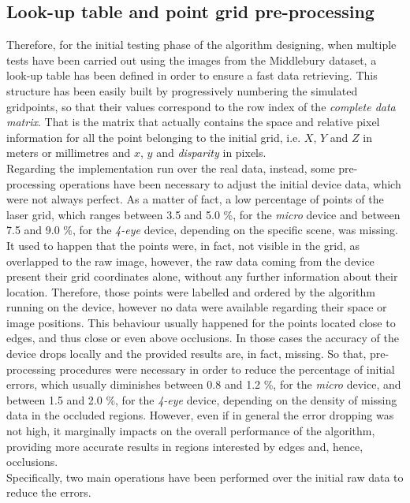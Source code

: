 \subsection{Look-up table and point grid pre-processing}
\label{subsection:grid-preprocessing}

Therefore, for the initial testing phase of the algorithm designing, when multiple tests have been carried out using the images from the Middlebury dataset, a look-up table has been defined in order to ensure a fast data retrieving. 
This structure has been easily built by progressively numbering the simulated gridpoints, so that their values correspond to the row index of the \textit{complete data matrix}.
That is the matrix that actually contains the space and relative pixel information for all the point belonging to the initial grid, i.e. $X$, $Y$ and $Z$ in meters or millimetres and $x$, $y$ and \textit{disparity} in pixels. \\
Regarding the implementation run over the real data, instead, some pre-processing operations have been necessary to adjust the initial device data, which were not always perfect. 
As a matter of fact, a low percentage of points of the laser grid, which ranges between 3.5 and 5.0 \%, for the \textit{micro} device and between 7.5 and 9.0 \%, for the \textit{4-eye} device, depending on the specific scene, was missing. 
It used to happen that the points were, in fact, not visible in the grid, as overlapped to the raw image, however, the raw data coming from the device present their grid coordinates alone, without any further information about their location.
Therefore, those points were labelled and ordered by the algorithm running on the device, however no data were available regarding their space or image positions.
This behaviour usually happened for the points located close to edges, and thus close or even above occlusions. 
In those cases the accuracy of the device drops locally and the provided results are, in fact, missing. 
So that, pre-processing procedures were necessary in order to reduce the percentage of initial errors, which usually diminishes between 0.8 and 1.2 \%, for the \textit{micro} device, and between 1.5 and 2.0 \%, for the \textit{4-eye} device, depending on the density of missing data in the occluded regions.
However, even if in general the error dropping was not high, it marginally impacts on the overall performance of the algorithm, providing more accurate results in regions interested by edges and, hence, occlusions. \\
Specifically, two main operations have been performed over the initial raw data to reduce the errors.
